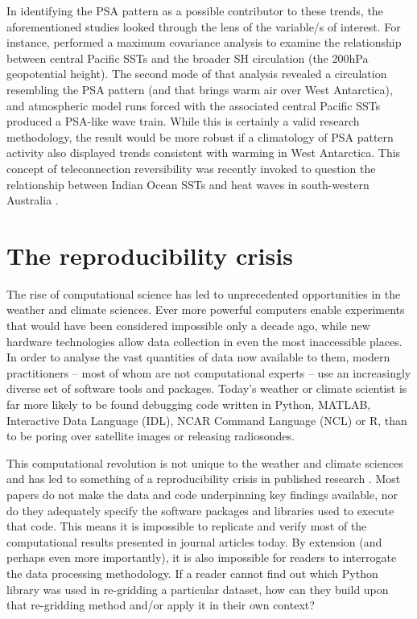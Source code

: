 In identifying the PSA pattern as a possible contributor to these trends, the aforementioned studies looked through the lens of the variable/s of interest. For instance, \citet{Ding2011} performed a maximum covariance analysis to examine the relationship between central Pacific SSTs and the broader SH circulation (the 200hPa geopotential height). The second mode of that analysis revealed a circulation resembling the PSA pattern (and that brings warm air over West Antarctica), and atmospheric model runs forced with the associated central Pacific SSTs produced a PSA-like wave train. While this is certainly a valid research methodology, the result would be more robust if a climatology of PSA pattern activity also displayed trends consistent with warming in West Antarctica. This concept of teleconnection reversibility was recently invoked to question the relationship between Indian Ocean SSTs and heat waves in south-western Australia \citep{Boschat2016}.   

 

\section{The reproducibility crisis}

The rise of computational science has led to unprecedented opportunities in the weather and climate sciences. Ever more powerful computers enable experiments that would have been considered impossible only a decade ago, while new hardware technologies allow data collection in even the most inaccessible places. In order to analyse the vast quantities of data now available to them, modern practitioners -- most of whom are not computational experts -- use an increasingly diverse set of software tools and packages. Today's weather or climate scientist is far more likely to be found debugging code written in Python, MATLAB, Interactive Data Language (IDL), NCAR Command Language (NCL) or R, than to be poring over satellite images or releasing radiosondes. 

This computational revolution is not unique to the weather and climate sciences and has led to something of a reproducibility crisis in published research \citep[e.g.][]{Peng2011}. Most papers do not make the data and code underpinning key findings available, nor do they adequately specify the software packages and libraries used to execute that code. This means it is impossible to replicate and verify most of the computational results presented in journal articles today. By extension (and perhaps even more importantly), it is also impossible for readers to interrogate the data processing methodology. If a reader cannot find out which Python library was used in re-gridding a particular dataset, how can they build upon that re-gridding method and/or apply it in their own context? 

